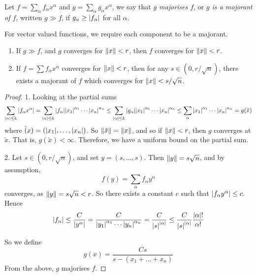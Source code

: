 \documentclass{article}
\begin{document}
\begin{definition}
    [majorise]
    Let \(f = \sum_\alpha f_\alpha x^\alpha\) and \(g = \sum_\alpha g_\alpha x^\alpha\), we say that \emph{\(g\) majorises \(f\)}, or \emph{\(g\) is a mojorant of \(f\)}, written \(g \gg f\), if \(g_\alpha \ge \abs{f_\alpha}\) for all \(\alpha\).
\end{definition}

For vector valued functions, we require each component to be a majorant.

\begin{lemma}
    \label{lem:majorant-props}
    \begin{enumerate}
        \item If \(g \gg f\), and \(g\) converges for \(\norm{x} < r\), then \(f\) converges for \(\norm{x} < r\).
        \item If \(f = \sum f_\alpha x^\alpha\) converges for \(\norm{x} < r\), then for any \(s \in (0, r/\sqrt n)\), there exists a majorant of \(f\) which converges for \(\norm{x} < s/\sqrt n\).
    \end{enumerate}
\end{lemma}

\begin{proof}
    1. Looking at the partial sums
    \[\sum_{\abs{\alpha} \le k}\abs{f_\alpha x^\alpha} = \sum_{\abs{\alpha} \le k}\abs{f_\alpha}\abs{x_1}^{\alpha_1} \cdots \abs{x_n}^{\alpha_n} \le \sum_{\abs{\alpha}\le k}\abs{g_\alpha}\abs{x_1}^{\alpha_1}\cdots\abs{x_n}^{\alpha_n} \le \sum_\alpha\abs{x_1}^{\alpha_1} \cdots \abs{x_n}^{\alpha_n} = g(\tilde x)\]
    where \(\tilde(x) = (\abs{x_1}, \dots, \abs{x_n})\). So \(\norm{\tilde x} = \norm{x}\), and so if \(\norm{x} < r\), then \(g\) converges at \(\tilde x\). That is, \(g(\tilde x) < \infty\). Therefore, we have a uniform bound on the partial sum.

    2. Let \(s \in (0, r/\sqrt n)\), and set \(y = (s, \dots, s)\). Then \(\norm{y} = s\sqrt n\), and by assumption,
    \[f(y) = \sum_\alpha f_\alpha y^\alpha\]
    converges, as \(\norm{y} = s\sqrt n < r\). So there exists a constant \(c\) such that \(\abs{f_\alpha y^\alpha} \le c\). Hence \[\abs{f_\alpha} \le \frac{C}{\abs{y^\alpha}} = \frac{C}{\abs{y_1}^{\alpha_1}\cdots \abs{y_n}^{\alpha_n}} = \frac{C}{\abs{s}^{\abs{\alpha}}} \le \frac{C}{\abs{s}^{\abs{\alpha}}}\frac{\abs{\alpha}!}{\alpha!}\]
    
    So we define
    \[g(x) = \frac{Cs}{s - (x_1 + \dots + x_n)}\]
    From the above, \(g\) majorises \(f\).
\end{proof}
\end{document}
